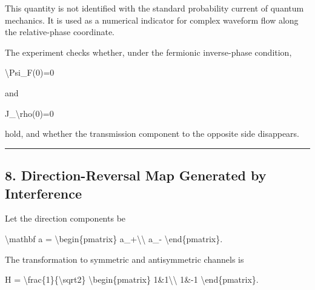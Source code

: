 \documentclass[
  a4paper,
]{article}
\newenvironment{Shaded}{}{}
\newcommand{\NormalTok}[1]{#1}
\begin{document}
This quantity is not identified with the standard probability current of
quantum mechanics. It is used as a numerical indicator for complex
waveform flow along the relative-phase coordinate.

The experiment checks whether, under the fermionic inverse-phase
condition,

\begin{Shaded}
\begin{Highlighting}[]
\NormalTok{\textbackslash{}Psi\_F(0)=0}
\end{Highlighting}
\end{Shaded}

and

\begin{Shaded}
\begin{Highlighting}[]
\NormalTok{J\_\textbackslash{}rho(0)=0}
\end{Highlighting}
\end{Shaded}

hold, and whether the transmission component to the opposite side
disappears.

\begin{center}\rule{0.5\linewidth}{0.5pt}\end{center}

\subsection{8. Direction-Reversal Map Generated by
Interference}\label{direction-reversal-map-generated-by-interference}

Let the direction components be

\begin{Shaded}
\begin{Highlighting}[]
\NormalTok{\textbackslash{}mathbf a}
\NormalTok{=}
\NormalTok{\textbackslash{}begin\{pmatrix\}}
\NormalTok{a\_+\textbackslash{}\textbackslash{}}
\NormalTok{a\_{-}}
\NormalTok{\textbackslash{}end\{pmatrix\}.}
\end{Highlighting}
\end{Shaded}

The transformation to symmetric and antisymmetric channels is

\begin{Shaded}
\begin{Highlighting}[]
\NormalTok{H}
\NormalTok{=}
\NormalTok{\textbackslash{}frac\{1\}\{\textbackslash{}sqrt2\}}
\NormalTok{\textbackslash{}begin\{pmatrix\}}
\NormalTok{1\&1\textbackslash{}\textbackslash{}}
\NormalTok{1\&{-}1}
\NormalTok{\textbackslash{}end\{pmatrix\}.}
\end{Highlighting}
\end{Shaded}
\end{document}
